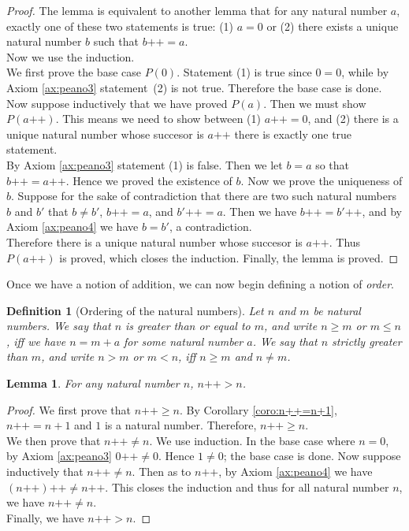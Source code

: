 \documentclass[a4paper]{book}
\newtheorem*{proof}{\textit{Proof.}}
\newtheorem{definition}{Definition}[section]
\newtheorem{lemma}{Lemma}[section]
\begin{document}
			\begin{proof}
				The lemma is equivalent to another lemma that for any natural number $a$, exactly one of these two statements is true: (1) $a=0$ or (2) there exists a unique natural number $b$ such that $b\texttt{++}=a$.\\
				Now we use the induction.\\
				We first prove the base case $P(0)$. Statement (1) is true since $0=0$, while by Axiom \ref{ax:peano3} statement~(2) is not true. Therefore the base case is done.\\
				Now suppose inductively that we have proved $P(a)$. Then we must show $P(a\texttt{++})$. This means we need to show between (1) $a\texttt{++}=0$, and (2) there is a unique natural number whose succesor is $a\texttt{++}$ there is exactly one true statement.\\
				By Axiom \ref{ax:peano3} statement (1) is false. Then we let $b=a$ so that $b\texttt{++}=a\texttt{++}$. Hence we proved the existence of $b$. Now we prove the uniqueness of $b$. Suppose for the sake of contradiction that there are two such natural numbers $b$ and $b'$ that $b \neq b'$, $b\texttt{++}=a$, and $b'\texttt{++}=a$. Then we have $b\texttt{++}=b'\texttt{++}$, and by Axiom \ref{ax:peano4} we have $b=b'$, a contradiction.
				\\Therefore there is a unique natural number whose succesor is $a\texttt{++}$. Thus $P(a\texttt{++})$ is proved, which closes the induction. Finally, the lemma is proved.
			\end{proof}
			Once we have a notion of addition, we can now begin defining a notion of \textit{order}.
			\begin{definition}[Ordering of the natural numbers]
				\label{def:order of natural numbers}
				Let $n$ and $m$ be natural numbers. We say that $n$ is greater than or equal to $m$, and write $n \geq m$ or $m \leq n$, iff we have $n=m+a$ for some natural number $a$. We say that $n$ strictly greater than $m$, and write $n>m$ or $m<n$, iff $n \geq m$ and $n\neq m$.
			\end{definition}
			\begin{lemma}
				\label{lem:n++>n}
				For any natural number $n$, $n\texttt{++}>n$.
			\end{lemma}
			\begin{proof}
				We first prove that $n\texttt{++} \geq n$. By Corollary \ref{coro:n++=n+1}, $n\texttt{++}=n+1$ and $1$ is a natural number. Therefore, $n\texttt{++} \geq n$.\\
				We then prove that $n\texttt{++}\neq n$. We use induction. In the base case where $n=0$, by Axiom \ref{ax:peano3} $0\texttt{++} \neq 0$. Hence $1 \neq 0$; the base case is done. Now suppose inductively that $n\texttt{++}\neq n$. Then as to $n\texttt{++}$, by Axiom \ref{ax:peano4} we have $(n\texttt{++})\texttt{++}\neq n\texttt{++}$. This closes the induction and thus for all natural number $n$, we have $n\texttt{++}\neq n$.\\
				Finally, we have $n\texttt{++}>n$.
			\end{proof}
\end{document}
